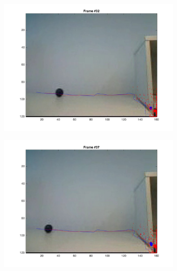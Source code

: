 \documentclass{ethz_report}
\begin{document}
\begin{figure}[h]
\begin{subfigure}[b]{.25\textwidth}
        \includegraphics[width=1\linewidth]{images/video3_observe_high_31}
    \end{subfigure}%
    \begin{subfigure}[b]{.25\textwidth}
        \centering
        \includegraphics[width=1\linewidth]{images/video3_observe_high_36}
    \end{subfigure}
    \begin{subfigure}[b]{.25\textwidth}
        \centering

\end{subfigure}
\end{figure}
\end{document}
